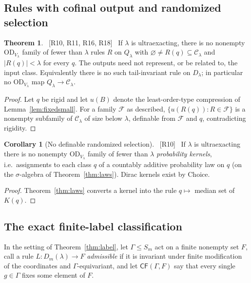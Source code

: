 \documentclass[11pt,letterpaper]{article}
\theoremstyle{definition}
\newtheorem{theorem}[definition]{Theorem}
\newtheorem{corollary}[definition]{Corollary}
\numberwithin{equation}{section}
\newcommand{\OD}{\mathrm{OD}}
\newcommand{\Clam}{\mathcal C_\lambda}
\newcommand{\CF}{\mathsf{CF}}
\newcommand{\src}[1]{\unskip\ {\normalfont\small\sffamily\color{Olive}[#1]}\ }
\begin{document}
\subsection{Rules with cofinal output and randomized selection}

\begin{theorem}\label{thm:conversion}\src{R10, R11, R16, R18}
If $\lambda$ is ultraexacting, there is no nonempty $\OD_{V_\lambda}$ family of fewer than $\lambda$ rules $R$ on $Q_\lambda$ with $\varnothing\ne R(q)\subseteq\Clam$ and $|R(q)|<\lambda$ for every $q$. The outputs need not represent, or be related to, the input class. Equivalently there is no such tail-invariant rule on $D_\lambda$; in particular no $\OD_{V_\lambda}$ map $Q_\lambda\to\Clam$.
\end{theorem}

\begin{proof}
Let $q$ be rigid and let $u(B)$ denote the least-order-type compression of Lemma~\ref{lem:fixedsmall}. For a family $\mathcal F$ as described, $\{u(R(q)):R\in\mathcal F\}$ is a nonempty subfamily of $\Clam$ of size below $\lambda$, definable from $\mathcal F$ and $q$, contradicting rigidity.
\end{proof}

\begin{corollary}[No definable randomized selection]\label{cor:kernel}\src{R10}
If $\lambda$ is ultraexacting there is no nonempty $\OD_{V_\lambda}$ family of fewer than $\lambda$ \emph{probability kernels}, i.e.\ assignments to each class $q$ of a countably additive probability law on $q$ (on the $\sigma$-algebra of Theorem~\ref{thm:laws}). Dirac kernels exist by Choice.
\end{corollary}

\begin{proof}
Theorem~\ref{thm:laws} converts a kernel into the rule $q\mapsto$ median set of $K(q)$.
\end{proof}

\subsection{The exact finite-label classification}\label{sec:class}

In the setting of Theorem~\ref{thm:label}, let $\Gamma\le S_m$ act on a finite nonempty set $F$, call a rule $L:D_m(\lambda)\to F$ \emph{admissible} if it is invariant under finite modification of the coordinates and $\Gamma$-equivariant, and let $\CF(\Gamma,F)$ say that every single $g\in\Gamma$ fixes some element of $F$.
\end{document}
